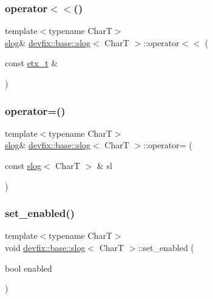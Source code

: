 \subsubsection{\texorpdfstring{operator$<$$<$()}{operator<<()}\hspace{0.1cm}{\footnotesize\ttfamily [3/3]}}
{\footnotesize\ttfamily template$<$typename CharT$>$ \\
\hyperlink{structdevfix_1_1base_1_1slog}{slog}\& \hyperlink{structdevfix_1_1base_1_1slog}{devfix\+::base\+::slog}$<$ CharT $>$\+::operator$<$$<$ (\begin{DoxyParamCaption}\item[{const \hyperlink{structdevfix_1_1base_1_1etx__t}{etx\+\_\+t} \&}]{ }\end{DoxyParamCaption})\hspace{0.3cm}{\ttfamily [inline]}}

\mbox{\label{structdevfix_1_1base_1_1slog_aad58f8eb55caedcc390357019b3f2d9f}} 
\subsubsection{\texorpdfstring{operator=()}{operator=()}}
{\footnotesize\ttfamily template$<$typename CharT$>$ \\
\hyperlink{structdevfix_1_1base_1_1slog}{slog}\& \hyperlink{structdevfix_1_1base_1_1slog}{devfix\+::base\+::slog}$<$ CharT $>$\+::operator= (\begin{DoxyParamCaption}\item[{const \hyperlink{structdevfix_1_1base_1_1slog}{slog}$<$ CharT $>$ \&}]{sl }\end{DoxyParamCaption})\hspace{0.3cm}{\ttfamily [delete]}}

\mbox{\label{structdevfix_1_1base_1_1slog_aec2d689cb06eb795bbd75c7df45df768}} 
\subsubsection{\texorpdfstring{set\+\_\+enabled()}{set\_enabled()}}
{\footnotesize\ttfamily template$<$typename CharT$>$ \\
void \hyperlink{structdevfix_1_1base_1_1slog}{devfix\+::base\+::slog}$<$ CharT $>$\+::set\+\_\+enabled (\begin{DoxyParamCaption}\item[{bool}]{enabled }\end{DoxyParamCaption})\hspace{0.3cm}{\ttfamily [inline]}}

